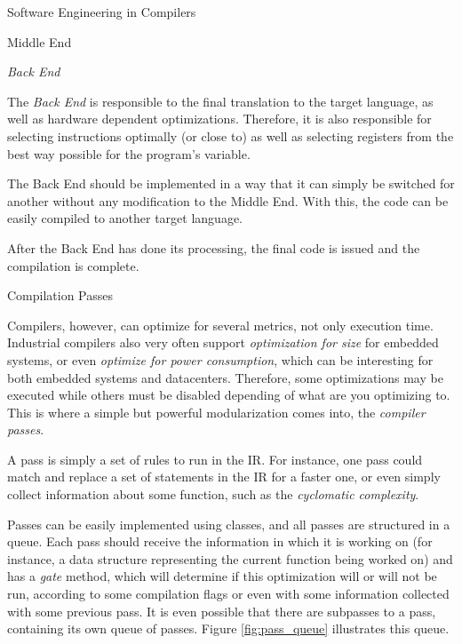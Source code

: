\begin{section}{Software Engineering in Compilers}
\begin{subsection}{Middle End}
\end{subsection}

\begin{subsection}{\textit{Back End}}

	The \textit{Back End} is responsible to the final translation to the
	target language, as well as hardware dependent optimizations. Therefore,
	it is also responsible for selecting instructions optimally (or close to)
	as well as selecting registers from the best way possible for the program's
	variable.

	The Back End should be implemented in a way that it can simply be switched
	for another without any modification to the Middle End. With this, the
	code can be easily compiled to another target language.

	After the Back End has done its processing, the final code is issued and the
	compilation is complete.
\end{subsection}

\begin{subsection}{Compilation Passes}

Compilers, however, can optimize for several metrics, not only execution time.
Industrial compilers also very often support \textit{optimization for size} for
embedded systems, or even \textit{optimize for power consumption}, which can
be interesting for both embedded systems and datacenters. Therefore, some
optimizations may be executed while others must be disabled depending of
what are you optimizing to. This is where a simple but powerful modularization
comes into, the \textit{compiler passes}.

A pass is simply a set of rules to run in the IR. For instance, one pass
could match and replace a set of statements in the IR for a faster one,
or even simply collect information about some function, such as the
\textit{cyclomatic complexity}.

Passes can be easily implemented using classes, and all passes are structured
in a queue. Each pass should receive the information in which it is working on
(for instance, a data structure representing the current function being worked
on) and has a \textit{gate} method, which will determine if this optimization
will or will not be run, according to some compilation flags or even with some
information collected with some previous pass. It is even possible that there
are subpasses to a pass, containing its own queue of passes. Figure \ref{fig:pass_queue}
illustrates this queue. 

\begin{figure}


\end{figure}
\end{subsection}
\end{section}
